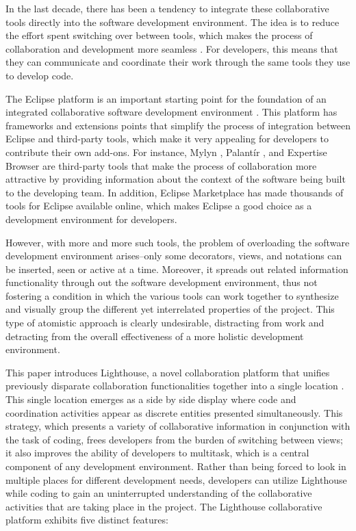 \documentclass[10pt, conference, compsocconf]{IEEEtran}
\begin{document}
In the last decade, there has been a tendency to integrate these collaborative tools directly into the software development environment. The idea is to reduce the effort spent switching over between tools, which makes the process of collaboration and development more seamless \cite{Booch:2003}. For developers, this means that they can communicate and coordinate their work through the same tools they use to develop code.

The Eclipse platform is an important starting point for the foundation of an integrated collaborative software development environment \cite{Cheng:2003}. This platform has frameworks and extensions points that simplify the process of integration between Eclipse and third-party tools, which make it very appealing for developers to contribute their own add-ons. For instance, Mylyn \cite{Kersten:2006}, Palant\'{i}r \cite{Sarma:2003:PRA}, and Expertise Browser \cite{Mockus:2002} are third-party tools that make the process of collaboration more attractive by providing information about the context of the software being built to the developing team. In addition, Eclipse Marketplace \cite{eclipse-marketplace} has made thousands of tools for Eclipse available online, which makes Eclipse a good choice as a development environment for developers.

However, with more and more such tools, the problem of overloading the software development environment arises--only some decorators, views, and notations can be inserted, seen or active at a time. Moreover, it spreads out related information functionality through out the software development environment, thus not fostering a condition in which the various tools can work together to synthesize and visually group the different yet interrelated properties of the project. This type of atomistic approach is clearly undesirable, distracting from work and detracting from the overall effectiveness of a more holistic development environment. 

This paper introduces Lighthouse, a novel collaboration platform that unifies previously disparate collaboration functionalities together into a single location \cite{Chen:2006}. This single location emerges as a side by side display where code and coordination activities appear as discrete entities presented simultaneously. This strategy, which presents a variety of collaborative information in conjunction with the task of coding, frees developers from the burden of switching between views; it also improves the ability of developers to multitask, which is a central component of any development environment. Rather than being forced to look in multiple places for different development needs, developers can utilize  Lighthouse while coding to gain an uninterrupted understanding of the collaborative activities that are taking place in the project. The Lighthouse collaborative platform exhibits five distinct features:
\end{document}
